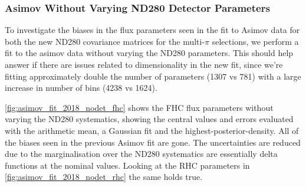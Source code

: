 \subsubsection{Asimov Without Varying ND280 Detector Parameters}
To investigate the biases in the flux parameters seen in the fit to Asimov data for both the new ND280 covariance matrices for the multi-$\pi$ selections, we perform a fit to the asimov data without varying the ND280 parameters. This should help answer if there are issues related to dimensionality in the new fit, since we're fitting approximately double the number of parameters (1307 vs 781) with a large increase in number of bins (4238 vs 1624).

\autoref{fig:asimov_fit_2018_nodet_fhc} shows the FHC flux parameters without varying the ND280 systematics, showing the central values and errors evaluated with the arithmetic mean, a Gaussian fit and the highest-posterior-density. All of the biases seen in the previous Asimov fit are gone. The uncertainties are reduced due to the marginalisation over the ND280 systematics are essentially delta functions at the nominal values. Looking at the RHC parameters in \autoref{fig:asimov_fit_2018_nodet_rhc} the same holds true.

